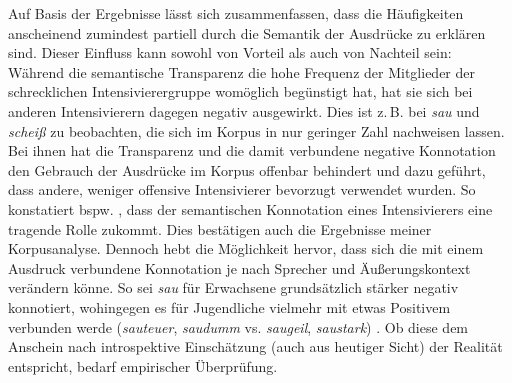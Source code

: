 Auf Basis der Ergebnisse lässt sich zusammenfassen, dass die Häufigkeiten anscheinend zumindest partiell durch die Semantik der Ausdrücke zu erklären sind. Dieser Einfluss kann sowohl von Vorteil als auch von Nachteil sein: Während die semantische Transparenz die hohe Frequenz der \mbox{Mitglieder} der \glqq{}schrecklichen\grqq{} Intensivierergruppe womöglich begünstigt hat, hat sie sich bei anderen Intensivierern dagegen negativ ausgewirkt. Dies ist z.\,B. bei \textit{sau} und \textit{scheiß} zu beobachten, die sich im Korpus in nur geringer Zahl nachweisen lassen. Bei ihnen hat die Transparenz und die damit verbundene negative Konnotation den Gebrauch der Ausdrücke im Korpus offenbar behindert und dazu geführt, dass andere, weniger offensive Intensivierer bevorzugt verwendet wurden. So konstatiert bspw. \citet[311]{Calpestrati.2017}, dass der semantischen Konnotation eines Intensivierers eine tragende Rolle zukommt. Dies bestätigen auch die Ergebnisse meiner Korpusanalyse. Dennoch hebt \citet[229]{Pittner.1989} die Möglichkeit hervor, dass sich die mit einem Ausdruck verbundene Konnotation je nach Sprecher und Äußerungskontext verändern könne. So sei \textit{sau} für Erwachsene grundsätzlich stärker negativ konnotiert, wohingegen es für Jugendliche vielmehr mit etwas Positivem verbunden werde (\textit{sauteuer}, \textit{saudumm} vs. \textit{saugeil}, \textit{saustark}) \citep[vgl.][229]{Pittner.1989}. Ob diese dem Anschein nach introspektive Einschätzung (auch aus heutiger Sicht) der Realität entspricht, bedarf empirischer Überprüfung.

